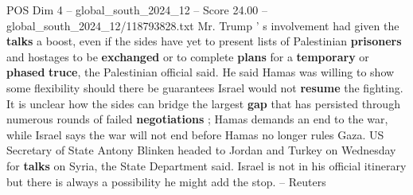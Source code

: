 \begin{textsample}{POS Dim 4 – global\_south\_2024\_12 – Score 24.00 – global\_south\_2024\_12/118793828.txt}
Mr.
Trump ' s involvement had given the \textbf{talks} a boost, even if the sides have yet to present lists of Palestinian \textbf{prisoners} and hostages to be \textbf{exchanged} or to complete \textbf{plans} for a \textbf{temporary} or \textbf{phased} \textbf{truce}, the Palestinian official said.
He said Hamas was willing to show some flexibility should there be guarantees Israel would not \textbf{resume} the fighting.
It is unclear how the sides can bridge the largest \textbf{gap} that has persisted through numerous rounds of failed \textbf{negotiations} ; Hamas demands an end to the war, while Israel says the war will not end before Hamas no longer rules Gaza.
US Secretary of State Antony Blinken headed to Jordan and Turkey on Wednesday for \textbf{talks} on Syria, the State Department said.
Israel is not in his official itinerary but there is always a possibility he might add the stop. -- Reuters

\end{textsample}
